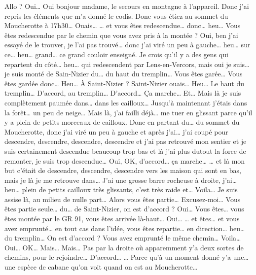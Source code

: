 \begin{dialogue}
  \Sec Allo ?
  \Req Oui…
  \Sec Oui bonjour madame, le secours en montagne à l'appareil. Donc
  j'ai repris les éléments que m'a donné le \ac{codis}. Donc vous
  étiez au sommet du Moucherotte à 17h30…
  \Req Ouais…
  \Sec … et vous êtes redescendue… donc… heu… Vous êtes redescendue
  par le chemin que vous avez pris à la montée ?
  \Req Oui, ben j'ai essayé de le trouver, je l'ai pas trouvé… donc
  j'ai viré un peu à gauche… heu… sur ce… heu… grand… ce grand couloir
  enseigné. Je crois qu'il y a des gens qui repartent du côté… heu…
  qui redescendent par Lens-en-Vercors, mais oui je suis… je suis
  monté de Sain-Nizier du… du haut du tremplin…
  \Sec Vous êtes garée… Vous êtes gardée donc… Heu… À Saint-Nizier ?
  \Req Saint-Nizier ouais… Heu… Le haut du tremplin…
  \Sec D'accord, au tremplin… D'accord… Ça marche…
  \Req Et… Mais là je suis complètement paumée dans… dans les
  cailloux… Jusqu'à maintenant j’étais dans la forêt… un peu de neige…
  Mais là, j'ai failli déjà… me tuer en glissant parce qu’il y a plein
  de petits morceaux de cailloux. Donc en partant du… du sommet du
  Moucherotte, donc j'ai viré un peu à gauche et après j'ai… j'ai
  coupé pour descendre, descendre, descendre, descendre et j'ai pas retrouvé mon
  sentier et je suis certainement descendue beaucoup trop bas et là
  j'ai plus dutout la force de remonter, je suis trop descendue…
  \Sec {} Oui, OK, d'accord… ça marche…
  \Req … et là mon but c'était de descendre, descendre, descendre vers
  les maison qui sont en bas, mais je là je me retrouve dans… J'ai une
  grosse barre rocheuse à droite, j'ai… heu… plein de petits cailloux
  très glissants, c'est très raide et… Voila… Je suis assise là, au
  milieu de nulle part…
  \Sec {} Alors vous êtes partie…
  Excusez-moi… Vous êtes partie seule… du… de Saint-Nizier, on est
  d'accord ?
  \Req Oui…
  \Sec Vous êtes… vous êtes montée par le GR 91, vous êtes arrivée
  là-haut…
  \Req {} Oui…
  \Sec … et êtes… et vous avez emprunté… en tout cas dans l'idée, vous
  êtes repartie… en direction… heu… du tremplin… On est d'accord ?
  Vous avez emprunté le même chemin…
  \Req {} Voila… Oui…
  \Sec OK…
  \Req Mais… Mais… Pas par la droite où apparemment y'a deux sortes de
  chemins, pour le rejoindre…
  \Sec {} D'accord…
  \Req … Parce-qu’à un moment donné y'a une… une espèce de cabane
  qu'on voit quand on est au Moucherotte…

\end{dialogue}
